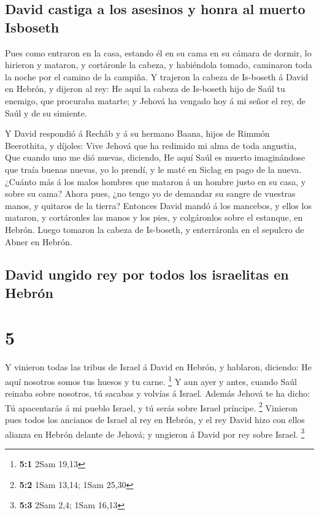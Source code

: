\hypertarget{david-castiga-a-los-asesinos-y-honra-al-muerto-isboseth}{%
\subsection{David castiga a los asesinos y honra al muerto
Isboseth}\label{david-castiga-a-los-asesinos-y-honra-al-muerto-isboseth}}

 Pues como entraron en la casa, estando él en su cama en su
cámara de dormir, lo hirieron y mataron, y cortáronle la cabeza, y
habiéndola tomado, caminaron toda la noche por el camino de la campiña.
 Y trajeron la cabeza de Is-boseth á David en Hebrón, y
dijeron al rey: He aquí la cabeza de Is-boseth hijo de Saúl tu enemigo,
que procuraba matarte; y Jehová ha vengado hoy á mi señor el rey, de
Saúl y de su simiente.

 Y David respondió á Rechâb y á su hermano Baana, hijos de
Rimmón Beerothita, y díjoles: Vive Jehová que ha redimido mi alma de
toda angustia,  Que cuando uno me dió nuevas, diciendo, He
aquí Saúl es muerto imaginándose que traía buenas nuevas, yo lo prendí,
y le maté en Siclag en pago de la nueva.  ¿Cuánto más á los
malos hombres que mataron á un hombre justo en su casa, y sobre su cama?
Ahora pues, ¿no tengo yo de demandar su sangre de vuestras manos, y
quitaros de la tierra?  Entonces David mandó á los
mancebos, y ellos los mataron, y cortáronles las manos y los pies, y
colgáronlos sobre el estanque, en Hebrón. Luego tomaron la cabeza de
Is-boseth, y enterráronla en el sepulcro de Abner en Hebrón.

\hypertarget{david-ungido-rey-por-todos-los-israelitas-en-hebruxf3n}{%
\subsection{David ungido rey por todos los israelitas en
Hebrón}\label{david-ungido-rey-por-todos-los-israelitas-en-hebruxf3n}}

\hypertarget{section-4}{%
\section{5}\label{section-4}}

 Y vinieron todas las tribus de Israel á David en Hebrón, y
hablaron, diciendo: He aquí nosotros somos tus huesos y tu carne.
\footnote{\textbf{5:1} 2Sam 19,13}  Y aun ayer y antes,
cuando Saúl reinaba sobre nosotros, tú sacabas y volvías á Israel.
Además Jehová te ha dicho: Tú apacentarás á mi pueblo Israel, y tú serás
sobre Israel príncipe. \footnote{\textbf{5:2} 1Sam 13,14; 1Sam 25,30}
 Vinieron pues todos los ancianos de Israel al rey en
Hebrón, y el rey David hizo con ellos alianza en Hebrón delante de
Jehová; y ungieron á David por rey sobre Israel. \footnote{\textbf{5:3}
  2Sam 2,4; 1Sam 16,13}

